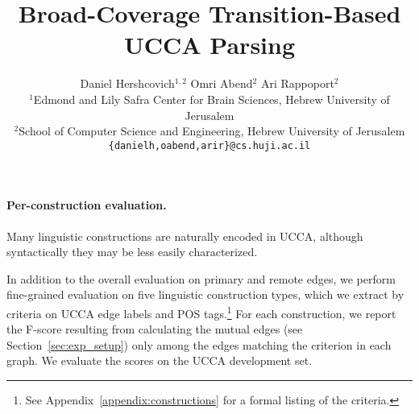 \documentclass[11pt,a4paper]{article}
\title{Broad-Coverage Transition-Based UCCA Parsing}
\author{Daniel Hershcovich$^{1,2}$ \And Omri Abend$^2$ \And Ari Rappoport$^2$ \\
  $^1$Edmond and Lily Safra Center for Brain Sciences, Hebrew University of Jerusalem \\
  $^2$School of Computer Science and Engineering, Hebrew University of Jerusalem \\
  \texttt{\{danielh,oabend,arir\}@cs.huji.ac.il}
}
\date{}
\newcommand{\parser}[1]{TUPA\textsubscript{#1}}
\newcommand{\secref}[1]{Section~\ref{#1}}
\begin{document}
\maketitle


\paragraph{Per-construction evaluation.}
Many linguistic constructions are naturally encoded in UCCA,
although syntactically they may be less easily characterized.

In addition to the overall evaluation on primary and remote edges,
we perform fine-grained evaluation on five linguistic construction types,
which we extract by criteria on UCCA edge labels and POS tags.\footnote{See
Appendix~\ref{appendix:constructions} for a formal listing of the criteria.}
For each construction, we report the F-score resulting from calculating the
mutual edges (see \secref{sec:exp_setup}) only among the edges matching the
criterion in each graph. We evaluate the scores on the UCCA development set.

\begin{table}[ht]
\caption{\label{table:constructions_results}
Results of evaluating \parser{BiLSTM} on UCCA edges corresponding to specific linguistic constructions.
Top: number of edges corresponding to each construction in the UCCA development corpus.
Bottom: labeled F-score of \parser{BiLSTM} (in percentages) calculated just on these edges.}
\end{table}
\end{document}
